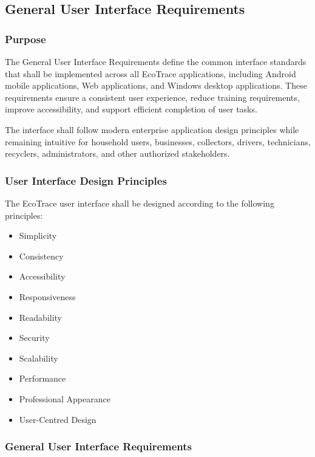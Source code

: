 \subsection{General User Interface Requirements}
\subsubsection*{Purpose}

The General User Interface Requirements define the common interface
standards that shall be implemented across all EcoTrace applications,
including Android mobile applications, Web applications, and Windows
desktop applications. These requirements ensure a consistent user
experience, reduce training requirements, improve accessibility, and
support efficient completion of user tasks.

The interface shall follow modern enterprise application design
principles while remaining intuitive for household users, businesses,
collectors, drivers, technicians, recyclers, administrators, and other
authorized stakeholders.


\subsubsection*{User Interface Design Principles}

The EcoTrace user interface shall be designed according to the following
principles:

\begin{itemize}
\item Simplicity
\item Consistency
\item Accessibility
\item Responsiveness
\item Readability
\item Security
\item Scalability
\item Performance
\item Professional Appearance
\item User-Centred Design
\end{itemize}


\subsubsection*{General User Interface Requirements}

